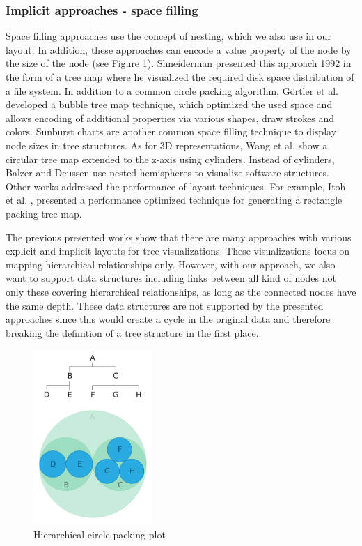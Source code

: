 \subsubsection{Implicit approaches - space filling}
Space filling approaches use the concept of nesting, which we also use in our layout. In addition, these approaches can encode a value property of the node by the size of the node (see Figure \ref{fig:hierarchicalCirclePlot}).
Shneiderman \cite{shneiderman_tree_1992} presented this approach 1992 in the form of a tree map where he visualized the required disk space distribution of a file system. In addition to a common circle packing algorithm, Görtler et al. \cite{gortler_bubble_2018} developed a bubble tree map technique, which optimized the used space and allows encoding of additional properties via various shapes, draw strokes and colors. Sunburst charts are another common space filling technique to display node sizes in tree structures. 
As for 3D representations, Wang et al. \cite{wang_visualization_2006} show a circular tree map extended to the z-axis using cylinders. Instead of cylinders, Balzer and Deussen \cite{balzer_hierarchy_2004} use nested hemispheres to visualize software structures.
Other works addressed the performance of layout techniques. For example, Itoh et al. \cite{itoh_hierarchical_2004}, presented a performance optimized technique for generating a rectangle packing tree map.

The previous presented works show that there are many approaches with various explicit and implicit layouts for tree visualizations. These visualizations focus on mapping hierarchical relationships only. 
However, with our approach, we also want to support data structures including links between all kind of nodes not only these covering hierarchical relationships, as long as the connected nodes have the same depth. These data structures are not supported by the presented approaches since this would create a cycle in the original data and therefore breaking the definition of a tree structure in the first place.

\begin{figure}[!hbt]
    \centering
    \includegraphics[width=0.40\textwidth, trim={0 0 0 4.3cm},clip]{graphics/circle_packing.pdf}
    \caption{Hierarchical circle packing plot \cite{ribecca_circle_nodate}}
    \label{fig:hierarchicalCirclePlot}
\end{figure}

